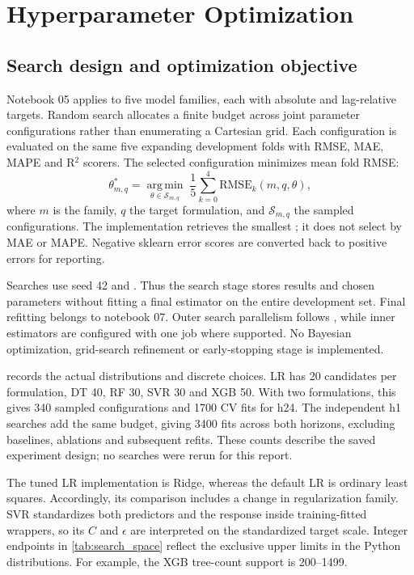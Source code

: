 \section{Hyperparameter Optimization}\label{sec:tuning}
\subsection{Search design and optimization objective}
Notebook 05 applies  to five model families, each with absolute and lag-relative targets. Random search allocates a finite budget across joint parameter configurations rather than enumerating a Cartesian grid\cite{bergstra2012}. Each configuration is evaluated on the same five expanding development folds with RMSE, MAE, MAPE and R$^2$ scorers. The selected configuration minimizes mean fold RMSE:
\begin{equation}
\theta^*_{m,q}=\underset{\theta\in\mathcal S_{m,q}}{\operatorname{arg\,min}}\;
\frac{1}{5}\sum_{k=0}^{4}\mathrm{RMSE}_{k}(m,q,\theta),
\label{eq:search_objective}
\end{equation}
where $m$ is the family, $q$ the target formulation, and $\mathcal S_{m,q}$ the sampled configurations. The implementation retrieves the smallest ; it does not select by MAE or MAPE. Negative sklearn error scores are converted back to positive errors for reporting.

Searches use seed 42 and . Thus the search stage stores results and chosen parameters without fitting a final estimator on the entire development set. Final refitting belongs to notebook 07. Outer search parallelism follows , while inner estimators are configured with one job where supported. No Bayesian optimization, grid-search refinement or early-stopping stage is implemented.

 records the actual distributions and discrete choices. LR has 20 candidates per formulation, DT 40, RF 30, SVR 30 and XGB 50. With two formulations, this gives 340 sampled configurations and \num{1700} CV fits for h24. The independent h1 searches add the same budget, giving \num{3400} fits across both horizons, excluding baselines, ablations and subsequent refits. These counts describe the saved experiment design; no searches were rerun for this report.


The tuned LR implementation is Ridge, whereas the default LR is ordinary least squares. Accordingly, its comparison includes a change in regularization family. SVR standardizes both predictors and the response inside training-fitted wrappers, so its $C$ and $\epsilon$ are interpreted on the standardized target scale. Integer endpoints in \cref{tab:search_space} reflect the exclusive upper limits in the Python distributions. For example, the XGB tree-count support is 200--1499.

